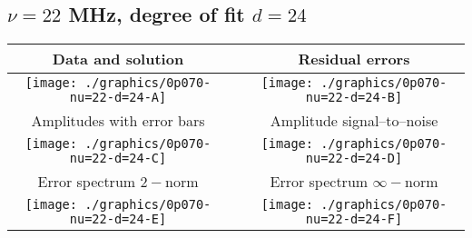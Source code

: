 

% 

\clearpage{}
\break{}

\subsection{$\nu = 22$ MHz, degree of fit $d = 24$}

\begin{table}[h]
    \begin{center}
        \begin{tabular}{ccc}
            Data and solution & \quad & Residual errors \\\hline
            \texttt{[image: ./graphics/0p070-nu=22-d=24-A]} &&
            \texttt{[image: ./graphics/0p070-nu=22-d=24-B]} \\[15pt]
            Amplitudes with error bars && Amplitude signal--to--noise \\\hline
            \texttt{[image: ./graphics/0p070-nu=22-d=24-C]} &&
            \texttt{[image: ./graphics/0p070-nu=22-d=24-D]} \\[15pt]
            Error spectrum $2-$norm && Error spectrum $\infty-$norm \\\hline
            \texttt{[image: ./graphics/0p070-nu=22-d=24-E]} &&
            \texttt{[image: ./graphics/0p070-nu=22-d=24-F]} \\[15pt]
        \end{tabular}
    \end{center}
\label{fig:elev=70, nu=22}
\end{table}



\endinput
